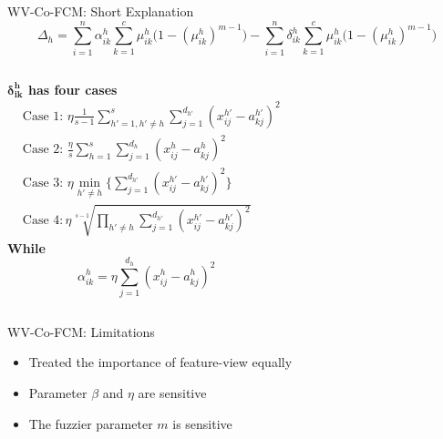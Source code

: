 \documentclass[compress,sky blue]{beamer}
\begin{document}
\begin{frame}{WV-Co-FCM: Short Explanation}
	\vspace{-0.3cm}	    
\begin{equation*}
\Delta_{h}   = \sum_{i=1}^{n} \alpha_{ik}^{h} \sum_{k=1}^{c} \mu_{ik}^{h} \Big ( 1- \left( \mu_{ik}^{h} \right )^{m-1} \Big ) - \sum_{i=1}^{n}\delta_{ik}^{h} \sum_{k=1}^{c} \mu_{ik}^{h} \Big ( 1- \left( \mu_{ik}^{h} \right )^{m-1} \Big )
\label{Delta1} 
\end{equation*}
\begin{columns}[c] %

\textbf{$\mathbf{\delta_{ik}^{h}}$ has four cases}
\begin{equation*}
\begin{aligned}
{} & \scriptstyle\text{Case 1: }\eta \frac{1}{s-1}\sum_{h'=1, h'\neq h}^{s}\sum_{j=1}^{d_{h'}}\left(x_{ij}^{h'}-a_{kj}^{h'}\right)^2\\
      & \scriptstyle \text{Case 2: } \frac{\eta}{s}\sum_{h=1}^{s}\sum_{j=1}^{d_{h}}\left(x_{ij}^{h}-a_{kj}^{h}\right)^2\\
      & \scriptstyle \text{Case 3: } \eta \min\limits_{h'\neq h}\big\{ \sum_{j=1}^{d_{h'}} \left ( x_{ij}^{h'}-a_{kj}^{h'} \right )^{2} \big \} \\
      & \scriptstyle \text{Case 4}: \eta \sqrt[s-1]{\prod_{h'\neq h} \sum_{j=1}^{d_{h'}} \left ( x_{ij}^{h'}-a_{kj}^{h'} \right )^{2} }
\end{aligned}
\label{constraint1}
\end{equation*}
\textbf{While }\begin{equation*}
\alpha_{ik}^{h} = \eta \sum_{j=1}^{d_{h}}\left(x_{ij}^{h}-a_{kj}^{h}\right)^2
\label{alpha1} 
\end{equation*}

\end{columns}

\end{frame}




\begin{frame}{WV-Co-FCM: Limitations}
	\vspace{-0.3cm}	
    
\begin{itemize}
\item Treated the importance of feature-view equally
\item Parameter $\beta$ and $\eta$ are sensitive 
\item The fuzzier parameter $m$ is sensitive
\end{itemize}

\end{frame}
\end{document}
